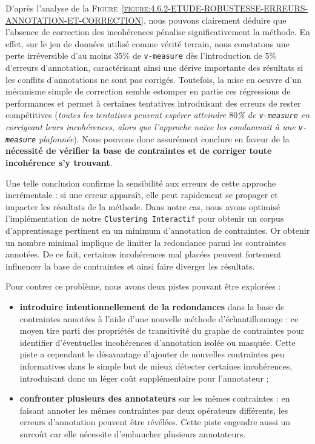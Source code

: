 			D'après l'analyse de la \textsc{Figure~\ref{figure:4.6.2-ETUDE-ROBUSTESSE-ERREURS-ANNOTATION-ET-CORRECTION}}, nous pouvons clairement déduire que l'absence de correction des incohérences pénalise significativement la méthode.
			En effet, sur le jeu de données utilisé comme vérité terrain, nous constatons une perte irréversible d'au moins $35$\% de \texttt{v-measure} dès l'introduction de $5$\% d'erreurs d'annotation, caractérisant ainsi une dérive importante des résultats si les conflits d'annotations ne sont pas corrigés.
			Toutefois, la mise en oeuvre d'un mécanisme simple de correction semble estomper en partie ces régressions de performances et permet à certaines tentatives introduisant des erreurs de rester compétitives
			(\textit{toutes les tentatives peuvent espérer atteindre $80$\% de \texttt{v-measure} en corrigeant leurs incohérences, alors que l'approche naïve les condamnait à une \texttt{v-measure} plafonnée}).
			Nous pouvons donc assurément conclure en faveur de la \textbf{nécessité de vérifier la base de contraintes et de corriger toute incohérence s'y trouvant}.
			
			Une telle conclusion confirme la sensibilité aux erreurs de cette approche incrémentale : si une erreur apparaît, elle peut rapidement se propager et impacter les résultats de la méthode.
			Dans notre cas, nous avons optimisé l'implémentation de notre \texttt{Clustering Interactif} pour obtenir un corpus d'apprentissage pertinent en un minimum d'annotation de contraintes.
			Or obtenir un nombre minimal implique de limiter la redondance parmi les contraintes annotées.
			De ce fait, certaines incohérences mal placées peuvent fortement influencer la base de contraintes et ainsi faire diverger les résultats.
			
			Pour contrer ce problème, nous avons deux pistes pouvant être explorées :
			
			\begin{itemize}
				\item \textbf{introduire intentionnellement de la redondances} dans la base de contraintes annotées à l'aide d'une nouvelle méthode d'échantillonnage : ce moyen tire parti des propriétés de transitivité du graphe de contraintes pour identifier d'éventuelles incohérences d'annotation isolée ou masquée.
				Cette piste a cependant le désavantage d'ajouter de nouvelles contraintes peu informatives dans le simple but de mieux détecter certaines incohérences, introduisant donc un léger coût supplémentaire pour l'annotateur ;
				\item \textbf{confronter plusieurs des annotateurs} sur les mêmes contraintes : en faisant annoter les mêmes contraintes par deux opérateurs différents, les erreurs d'annotation peuvent être révélées.
				Cette piste engendre aussi un surcoût car elle nécessite d'embaucher plusieurs annotateurs.
			\end{itemize}
			
